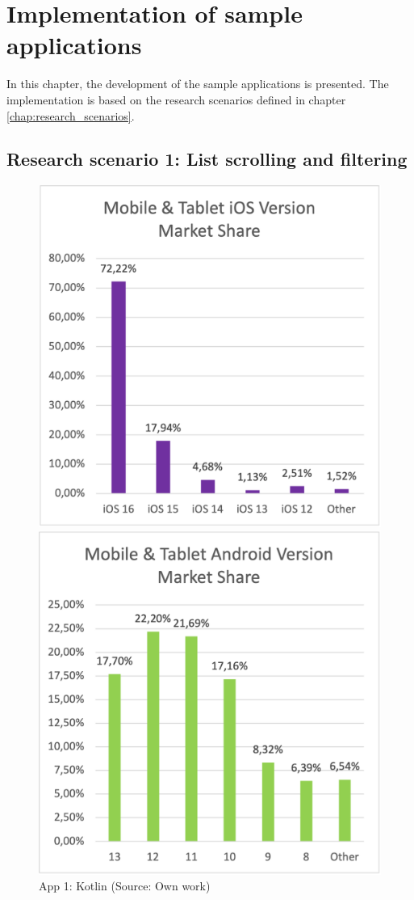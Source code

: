 
\chapter{Implementation of sample applications}

In this chapter, the development of the sample applications is presented. The implementation is based on the research scenarios defined in chapter \ref{chap:research_scenarios}.

\section{Research scenario 1: List scrolling and filtering}

\begin{figure}
    \begin{minipage}{.47\textwidth}
      \includegraphics[width=.5\textwidth]{img/ios_ver_market_share}
      \caption{App 1: Kotlin (Source: Own work)}
      \label{fig:app1_kotlin}
    \end{minipage}
    \hfill
    \begin{minipage}{.47\textwidth}
      \includegraphics[width=\textwidth]{img/android_ver_market_share}

\end{minipage}
\end{figure}
